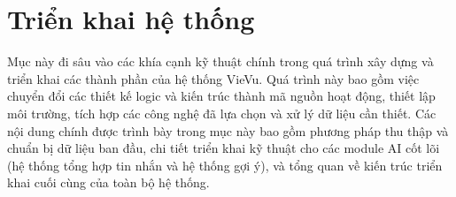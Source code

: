 \section{Triển khai hệ thống}
Mục này đi sâu vào các khía cạnh kỹ thuật chính trong quá trình xây dựng và triển khai các thành phần của hệ thống VieVu. Quá trình này bao gồm việc chuyển đổi các thiết kế logic và kiến trúc thành mã nguồn hoạt động, thiết lập môi trường, tích hợp các công nghệ đã lựa chọn và xử lý dữ liệu cần thiết. Các nội dung chính được trình bày trong mục này bao gồm phương pháp thu thập và chuẩn bị dữ liệu ban đầu, chi tiết triển khai kỹ thuật cho các module AI cốt lõi (hệ thống tổng hợp tin nhắn và hệ thống gợi ý), và tổng quan về kiến trúc triển khai cuối cùng của toàn bộ hệ thống.

% 

% 









